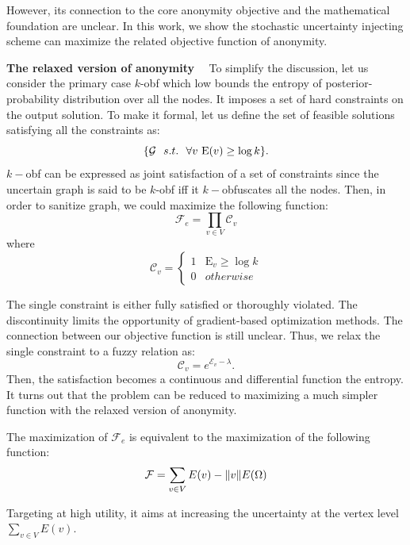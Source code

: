 However, its connection to the core anonymity objective and the mathematical foundation are unclear. 
In this work, we show the stochastic uncertainty injecting scheme can maximize the related objective function of anonymity.  

\textbf{The relaxed version of anonymity}~~
To simplify the discussion, let us consider the primary case $k$-obf which low bounds the entropy of posterior-probability distribution over all the nodes.  
It imposes a set of hard constraints on the output solution. 
To make it formal, let us define the set of feasible solutions satisfying all the constraints as:
\begin{equation*}
  \{\mathcal{G}~~s.t.~~ \forall v ~\mathrm{E}(v) \ge  \log k \}. 
\end{equation*}
$k-$obf can be expressed as joint satisfaction of a set of constraints 
since the uncertain graph is said to be $k$-obf iff it $k-$obfuscates all the nodes. 
Then, in order to sanitize graph, we could maximize the following function: 
\begin{equation*}
    \mathcal{F}_{e} = \prod_{v \in V} \mathcal{C}_{v}              
\end{equation*} 
where 
\begin{equation*}
  \mathcal{C}_{v} = 
  \begin{cases}
    1 & \mathrm{E}_{v} \ge  \log k \\ 
    0 & otherwise 
  \end{cases}
\end{equation*}

The single constraint {\Constraint} is either fully satisfied or thoroughly violated. 
The discontinuity limits the opportunity of gradient-based optimization methods.
The connection between our objective function is still unclear.  
Thus, we relax the single constraint {\Constraint} to a fuzzy relation as: 
\begin{equation*}
  \mathcal{C}_{v} = e^{\mathcal{E}_{v}-\lambda}.
\end{equation*}
Then, the satisfaction becomes a continuous and differential function {\wrt} the entropy. 
It turns out that the problem can be reduced to maximizing a much simpler function with the relaxed version of anonymity.  

\begin{observation}
  The maximization of $\mathcal{F}_{e}$ is equivalent to the maximization of the following function:
  \begin{equation*}
    \mathcal{F} =  \sum_{v\in V} E(v) - \|v\| E(\Omega)
  \end{equation*}
\end{observation}
Targeting at high utility, it aims at increasing the uncertainty at the vertex level $\sum_{v \in V} E(v)$. 

